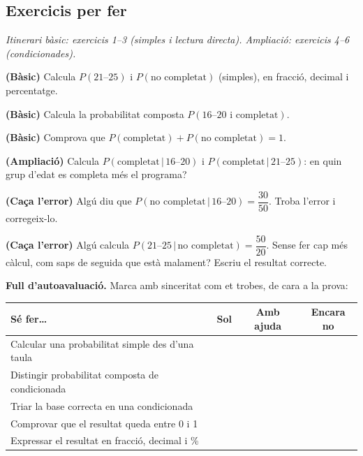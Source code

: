 \subsection{Exercicis per fer}

\noindent\textit{Itinerari bàsic: exercicis 1--3 (simples i lectura directa). Ampliació:
exercicis 4--6 (condicionades).}

\begin{exercicis}
\begin{exlist}
  \item \textbf{(Bàsic)} Calcula $P(\text{21--25})$ i $P(\text{no completat})$ (simples),
        en fracció, decimal i percentatge.
  \item \textbf{(Bàsic)} Calcula la probabilitat composta $P(\text{16--20 i completat})$.
  \item \textbf{(Bàsic)} Comprova que $P(\text{completat})+P(\text{no completat})=1$.
  \item \textbf{(Ampliació)} Calcula $P(\text{completat}\,|\,\text{16--20})$ i
        $P(\text{completat}\,|\,\text{21--25})$: en quin grup d'edat es completa més el
        programa?
  \item \textbf{(Caça l'error)} Algú diu que
        $P(\text{no completat}\,|\,\text{16--20})=\dfrac{30}{50}$. Troba l'error i
        corregeix-lo.
  \item \textbf{(Caça l'error)} Algú calcula
        $P(\text{21--25}\,|\,\text{no completat})=\dfrac{50}{20}$. Sense fer cap més
        càlcul, com saps de seguida que està malament? Escriu el resultat correcte.
\end{exlist}
\end{exercicis}

\begin{idea}
\textbf{Full d'autoavaluació.} Marca amb sinceritat com et trobes, de cara a la prova:
\begin{center}
\renewcommand{\arraystretch}{1.4}
\begin{tabular}{p{8.4cm} c c c}
\toprule
\textbf{Sé fer\dots} & \textbf{Sol} & \textbf{Amb ajuda} & \textbf{Encara no} \\
\midrule
Calcular una probabilitat simple des d'una taula & & & \\
Distingir probabilitat composta de condicionada & & & \\
Triar la base correcta en una condicionada & & & \\
Comprovar que el resultat queda entre 0 i 1 & & & \\
Expressar el resultat en fracció, decimal i \% & & & \\
\bottomrule
\end{tabular}
\end{center}
\end{idea}

